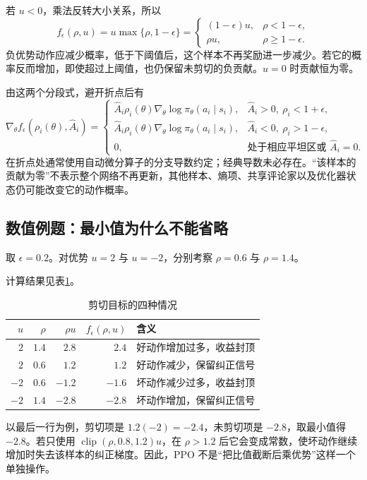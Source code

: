 \documentclass[UTF8,12pt,a4paper,fontset=fandol]{ctexart}
\begin{document}
若 $u<0$，乘法反转大小关系，所以
\begin{equation}
  f_\epsilon(\rho,u)
  =u\max\{\rho,1-\epsilon\}
  =
  \begin{cases}
    (1-\epsilon)u,&\rho<1-\epsilon,\\
    \rho u,&\rho\ge1-\epsilon.
  \end{cases}
  \label{eq:ppo-negative-clip}
\end{equation}
负优势动作应减少概率，低于下阈值后，这个样本不再奖励进一步减少。若它的概率反而增加，即使超过上阈值，也仍保留未剪切的负贡献。$u=0$ 时贡献恒为零。

由这两个分段式，避开折点后有
\begin{equation}
  \nabla_\theta f_\epsilon(\rho_i(\theta),\widehat A_i)
  =
  \begin{cases}
    \widehat A_i\rho_i(\theta)
      \nabla_\theta\log\pi_\theta(a_i\mid s_i),
       & \widehat A_i>0,\ \rho_i<1+\epsilon,\\
    \widehat A_i\rho_i(\theta)
      \nabla_\theta\log\pi_\theta(a_i\mid s_i),
       & \widehat A_i<0,\ \rho_i>1-\epsilon,\\
    0,&\text{处于相应平坦区或 }\widehat A_i=0.
  \end{cases}
  \label{eq:ppo-clip-gradient}
\end{equation}
在折点处通常使用自动微分算子的分支导数约定；经典导数未必存在。“该样本的贡献为零”不表示整个网络不再更新，其他样本、熵项、共享评论家以及优化器状态仍可能改变它的动作概率。

\subsection{数值例题：最小值为什么不能省略}

\begin{example}[四种概率变化]
取 $\epsilon=0.2$。对优势 $u=2$ 与 $u=-2$，分别考察 $\rho=0.6$ 与 $\rho=1.4$。
\end{example}
\begin{solve}
计算结果见表\ref{tab:ppo-clipping-cases}。
\begin{table}
  \centering
  \caption{剪切目标的四种情况}
  \label{tab:ppo-clipping-cases}
  \begin{tabular}{rrrrl}
    \toprule
    $u$ & $\rho$ & $\rho u$ & $f_\epsilon(\rho,u)$ & 含义 \\
    \midrule
    $2$  & $1.4$ & $2.8$  & $2.4$  & 好动作增加过多，收益封顶 \\
    $2$  & $0.6$ & $1.2$  & $1.2$  & 好动作减少，保留纠正信号 \\
    $-2$ & $0.6$ & $-1.2$ & $-1.6$ & 坏动作减少过多，收益封顶 \\
    $-2$ & $1.4$ & $-2.8$ & $-2.8$ & 坏动作增加，保留纠正信号 \\
    \bottomrule
  \end{tabular}
\end{table}
以最后一行为例，剪切项是 $1.2(-2)=-2.4$，未剪切项是 $-2.8$，取最小值得 $-2.8$。若只使用
$\operatorname{clip}(\rho,0.8,1.2)u$，在 $\rho>1.2$ 后它会变成常数，使坏动作继续增加时失去该样本的纠正梯度。因此，PPO 不是“把比值截断后乘优势”这样一个单独操作。
\end{solve}
\end{document}
